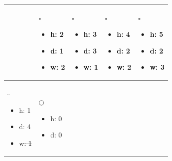 \begin{table}[h]
\begin{tabular}{|p{3cm}|p{3cm}|p{3cm}|p{3cm}|p{3cm}|}
\begin{itemize}
\end{itemize} 

& 

 $ \square $
\begin{itemize} 
    \vspace*{-1\baselineskip} 
    \item h: 2
    \item d: 1
    \item w: 2
\end{itemize} 

& 

 $ \square $
\begin{itemize} 
    \vspace*{-1\baselineskip} 
    \item h: 3
    \item d: 3
    \item w: 1

\end{itemize} 

& 

 $ \square $
\begin{itemize} 
    \vspace*{-1\baselineskip} 
    \item h: 4
    \item d: 2
    \item w: 2
\end{itemize} 

& 

 $ \square $
\begin{itemize} 
    \vspace*{-1\baselineskip} 
    \item h: 5
    \item d: 2
    \item w: 3
\end{itemize} 

\\ \hline


 $ \square $
\begin{itemize} 
    \vspace*{-1\baselineskip} 
    \item h: 1
    \item d: 4
    \item \sout{w: 1}
\end{itemize} 

& 

 $ \bigcirc $
\begin{itemize} 
    \vspace*{-1\baselineskip} 
    \item h: 0
    \item d: 0
\end{itemize} 


\end{tabular}
\end{table}
